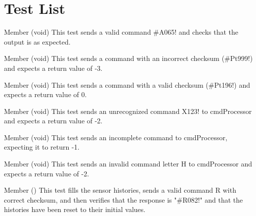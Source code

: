 \chapter{Test List}
\hypertarget{test}{}\label{test}

\begin{DoxyRefList}
\item[Member \doxylink{test_8c_a19855bd2bb8e13a233019a0f7fad605f}{test\+\_\+cmd\+Processor\+\_\+\+A\+\_\+output\+\_\+correta} (void)]\label{test__test000016}%
%
This test sends a valid command \#\+A065! and checks that the output is as expected.  
\item[Member \doxylink{test_8c_a30a52f68b84d1fbef64afc494902f19c}{test\+\_\+cmd\+Processor\+\_\+checksum\+\_\+errado\+\_\+entrada} (void)]\label{test__test000011}%
%
This test sends a command with an incorrect checksum (\#\+Pt999!) and expects a return value of -\/3.  
\item[Member \doxylink{test_8c_a7e8ed3d662076caeafc416cbe2ea9f8b}{test\+\_\+cmd\+Processor\+\_\+checksum\+\_\+valido\+\_\+entrada} (void)]\label{test__test000012}%
%
This test sends a command with a valid checksum (\#\+Pt196!) and expects a return value of 0.  
\item[Member \doxylink{test_8c_ad6080109cac33879f22777da9a49d951}{test\+\_\+cmd\+Processor\+\_\+comando\+\_\+invalido} (void)]\label{test__test000010}%
%
This test sends an unrecognized command \textquotesingle{}X123!\textquotesingle{} to cmd\+Processor and expects a return value of -\/2.  
\item[Member \doxylink{test_8c_adeccaed3699ec8e363ca7bc03dd02b82}{test\+\_\+cmd\+Processor\+\_\+incompleto} (void)]\label{test__test000008}%
%
This test sends an incomplete command to cmd\+Processor, expecting it to return -\/1.  
\item[Member \doxylink{test_8c_adfa177ab5219ecb8095f323d65203787}{test\+\_\+cmd\+Processor\+\_\+letra\+\_\+comando\+\_\+invalido} (void)]\label{test__test000009}%
%
This test sends an invalid command letter \textquotesingle{}H\textquotesingle{} to cmd\+Processor and expects a return value of -\/2.  
\item[Member \doxylink{test_8c_a1ecd685f3730b8a729af276e33114127}{test\+\_\+cmd\+Processor\+\_\+\+R\+\_\+reset\+\_\+historico} ()]\label{test__test000017}%
%
This test fills the sensor histories, sends a valid command \textquotesingle{}R\textquotesingle{} with correct checksum, and then verifies that the response is "{}\#\+R082!"{} and that the histories have been reset to their initial values.  

\end{DoxyRefList}
